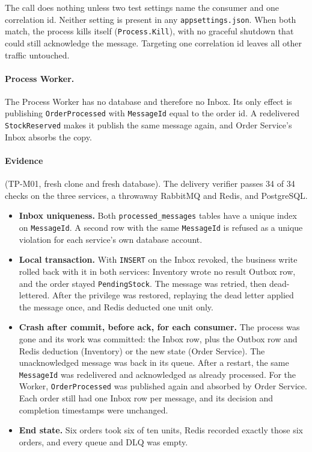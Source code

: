 \documentclass[a4paper]{report}
\begin{document}
The call does nothing unless two test settings name the consumer and one
correlation id. Neither setting is present in any \texttt{appsettings.json}.
When both match, the process kills itself (\texttt{Process.Kill}), with no
graceful shutdown that could still acknowledge the message. Targeting one
correlation id leaves all other traffic untouched.

\paragraph{Process Worker.} The Process Worker has no database and therefore
no Inbox. Its only effect is publishing \texttt{OrderProcessed} with
\texttt{MessageId} equal to the order id. A redelivered
\texttt{StockReserved} makes it publish the same message again, and Order
Service's Inbox absorbs the copy.

\paragraph{Evidence} (TP-M01, fresh clone and fresh database).
The delivery verifier passes 34 of 34 checks on the three services,
a throwaway RabbitMQ and Redis, and PostgreSQL.

\begin{itemize}
  \item \textbf{Inbox uniqueness.} Both \texttt{processed\_messages} tables
    have a unique index on \texttt{MessageId}. A second row with the same
    \texttt{MessageId} is refused as a unique violation for each service's
    own database account.
  \item \textbf{Local transaction.} With \texttt{INSERT} on the Inbox
    revoked, the business write rolled back with it in both services:
    Inventory wrote no result Outbox row, and the order stayed
    \texttt{PendingStock}. The message was retried, then dead-lettered.
    After the privilege was restored, replaying the dead letter applied the
    message once, and Redis deducted one unit only.
  \item \textbf{Crash after commit, before ack, for each consumer.} The
    process was gone and its work was committed: the Inbox row, plus the
    Outbox row and Redis deduction (Inventory) or the new state (Order
    Service). The unacknowledged message was back in its queue. After a
    restart, the same \texttt{MessageId} was redelivered and acknowledged as
    already processed. For the Worker, \texttt{OrderProcessed} was published
    again and absorbed by Order Service. Each order still had one Inbox row
    per message, and its decision and completion timestamps were unchanged.
  \item \textbf{End state.} Six orders took six of ten units, Redis
    recorded exactly those six orders, and every queue and DLQ was empty.
\end{itemize}
\end{document}
